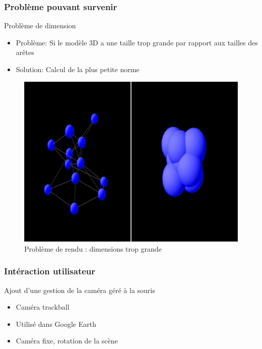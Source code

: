 \documentclass[handout]{beamer}
\begin{document}
\begin{frame}
  \frametitle{Problème pouvant survenir}

  \begin{block}{Problème de dimension}
    \begin{itemize}
    \item Problème: Si le modèle 3D a une taille trop grande par rapport aux tailles des arêtes
    \item Solution: Calcul de la plus petite norme
    \end{itemize}
  \end{block}

  \begin{figure}[h]
    \begin{center}
      \includegraphics[scale=0.3]{contents/pb2node}
    \end{center}
    \caption{Problème de rendu : dimensions trop grande}
    \label{fig:pb2node}
  \end{figure}
\end{frame}

\begin{frame}
  \frametitle{Intéraction utilisateur}

  \begin{block}{Ajout d'une gestion de la caméra géré à la souris}
    \begin{itemize}
    \item Caméra trackball
    \item Utilisé dans Google Earth
    \item Caméra fixe, rotation de la scène
    \end{itemize}
  \end{block}
\end{frame}
\end{document}
